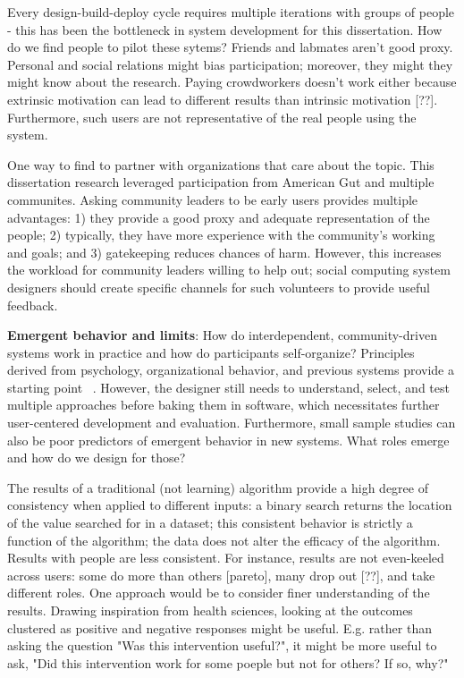 Every design-build-deploy cycle requires multiple iterations with groups of people - this has been the bottleneck in system development for this dissertation. How do we find people to pilot these sytems? Friends and labmates aren't good proxy. Personal and social relations might bias participation; moreover, they might they might know about the research. Paying crowdworkers doesn't work either because extrinsic motivation can lead to different results than intrinsic motivation [??]. Furthermore, such users are not representative of the real people using the system.

One way to find to partner with organizations that care about the topic. This dissertation research leveraged participation from American Gut and multiple communites. Asking community leaders to be early users provides multiple advantages: 1) they provide a good proxy and adequate representation of the people; 2) typically, they have more experience with the community's working and goals; and 3) gatekeeping reduces chances of harm. However, this increases the workload for community leaders willing to help out; social computing system designers should create specific channels for such volunteers to provide useful feedback.



\textbf{Emergent behavior and limits}: How do interdependent, community-driven systems work in practice and how do participants self-organize? Principles derived from psychology, organizational behavior, and previous systems provide a starting point ~\cite{fromstatement}. However, the designer still needs to understand, select, and test multiple approaches before baking them in software, which necessitates further user-centered development and evaluation. Furthermore, small sample studies can also be poor predictors of emergent behavior in new systems. What roles emerge and how do we design for those?

The results of a traditional (not learning) algorithm provide a high degree of consistency when applied to different inputs: a binary search returns the location of the value searched for in a dataset; this consistent behavior is strictly a function of the algorithm; the data does not alter the efficacy of the algorithm. Results with people are less consistent. For instance, results are not even-keeled across users: some do more than others [pareto], many drop out [??], and take different roles. One approach would be to consider finer understanding of the results. Drawing inspiration from health sciences, looking at the outcomes clustered as positive and negative responses might be useful. E.g. rather than asking the question "Was this intervention useful?", it might be more useful to ask, "Did this intervention work for some poeple but not for others? If so, why?"


